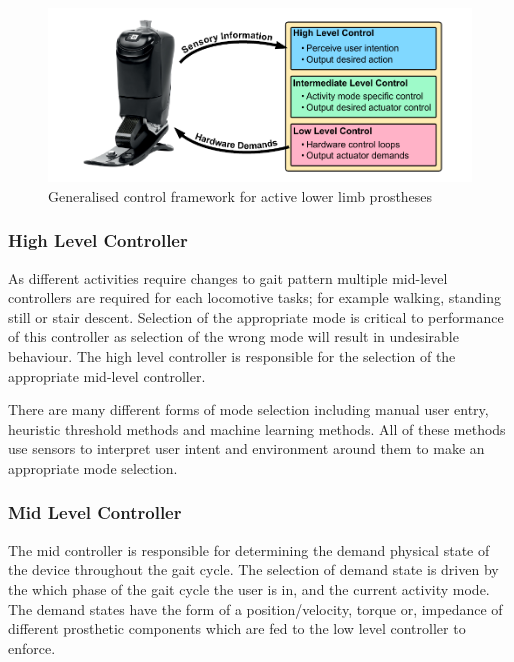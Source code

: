 \begin{figure}[!hbt]
    \centering
    \includegraphics[width=\textwidth]{content/2-Background/control_hierarchy.pdf}
    \caption{Generalised control framework for active lower limb prostheses}
    \label{Fig:lit-rev-controller_framework}
\end{figure}

\subsubsection{High Level Controller}
As different activities require changes to gait pattern multiple mid-level controllers are required for each locomotive tasks; for example walking, standing still or stair descent. Selection of the appropriate mode is critical to performance of this controller as selection of the wrong mode will result in undesirable behaviour. The high level controller is responsible for the selection of the appropriate mid-level controller.\cite{Tucker2015}

There are many different forms of mode selection including manual user entry, heuristic threshold methods\cite{Varol2010, Kazemimoghadam2021, Rabe2021} and machine learning methods\cite{Li2022, Wang2019b}. All of these methods use sensors to interpret user intent and environment around them to make an appropriate mode selection.

\subsubsection{Mid Level Controller}
The mid controller is responsible for determining the demand physical state of the device throughout the gait cycle. The selection of demand state is driven by the which phase of the gait cycle the user is in, and the current activity mode. The demand states have the form of a position/velocity, torque or, impedance of different prosthetic components which are fed to the low level controller to enforce.\cite{Tucker2015}

